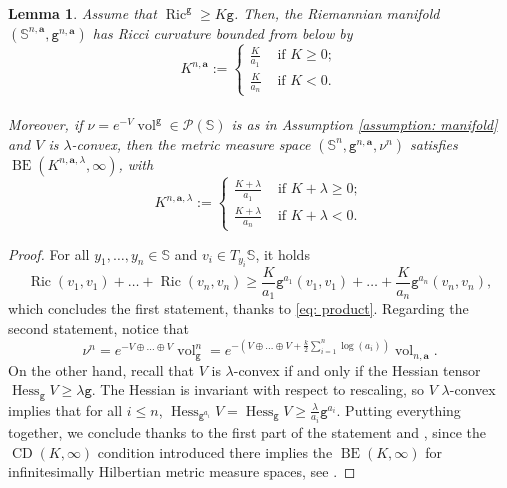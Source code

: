 \documentclass[10pt,leqno]{amsart}
\numberwithin{equation}{section}
\newtheorem{lemma}[teorema]{Lemma}
\newcommand{\PP}{\mathcal{P}}
\newcommand{\ttg}{\mathtt{g}}
\newcommand{\Ss}{\mathbb{S}}
\begin{document}
\begin{lemma}\label{lemma: curvature product}
    Assume that $\operatorname{Ric}^{\ttg} \geq K \ttg$. Then, the Riemannian manifold $(\Ss^{n,\mathbf{a}}, \ttg^{n,\mathbf{a}})$ has Ricci curvature bounded from below by
    \[K^{n,\mathbf{a}} := 
    \begin{cases}
    \frac{K}{a_1} & \text{ if }K\geq0; \\
    \frac{K}{a_n} & \text{ if }K<0.
    \end{cases}\]
    \\
    Moreover, if $\nu = e^{-V}\operatorname{vol}^\ttg \in \PP(\Ss)$ is as in Assumption \ref{assumption: manifold} and $V$ is $\lambda$-convex, then the metric measure space $(\Ss^n, \ttg^{n,\mathbf{a}}, \nu^{n})$ satisfies $\operatorname{BE}( K^{n,\mathbf{a},\lambda} ,\infty)$, with 
    \[K^{n,\mathbf{a},\lambda} := 
    \begin{cases}
    \frac{K+\lambda}{a_1} & \text{ if }K+\lambda\geq0; \\
    \frac{K+\lambda}{a_n} & \text{ if }K+\lambda<0.
    \end{cases}\]
\end{lemma}

\begin{proof}
    For all $y_1,\dots,y_n \in \Ss$ and $v_i \in T_{y_i}\Ss$, it holds
    \begin{equation}
    \operatorname{Ric}(v_1,v_1)+ \dots + \operatorname{Ric}(v_n,v_n) \geq \frac{K}{a_1} \ttg^{a_1}(v_1,v_1) + \dots + \frac{K}{a_n}\ttg^{a_n}(v_n,v_n), 
    \end{equation}
    which concludes the first statement, thanks to \eqref{eq: product}. Regarding the second statement, notice that 
    \[\nu^n = e^{-V\oplus \dots \oplus V} \operatorname{vol}_\ttg^n = e^{-\left(V\oplus \dots \oplus V + \frac{k}{2}\sum_{i=1}^n \log(a_i)\right)} \operatorname{vol}_{n,\mathbf{a}}.\]
    On the other hand, recall that $V$ is $\lambda$-convex if and only if the Hessian tensor $\operatorname{Hess}_\ttg V \geq \lambda \ttg$. The Hessian is invariant with respect to rescaling, so $V$ $\lambda$-convex implies that for all $i\leq n$, $\operatorname{Hess}_{\ttg^{a_i}} V = \operatorname{Hess}_{\ttg} V  \geq \frac{\lambda}{a_i}\ttg^{a_i}$. Putting everything together, we conclude thanks to the first part of the statement and \cite[Theorem 4.9]{sturm2006geometry}, since the $\operatorname{CD}(K,\infty)$ condition introduced there implies the $\operatorname{BE}(K,\infty)$ for infinitesimally Hilbertian metric measure spaces, see \cite{savare2013self}.
\end{proof}
\end{document}
